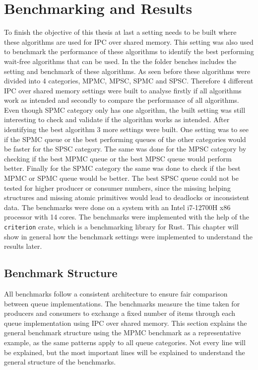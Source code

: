 \chapter{Benchmarking and Results}\label{ch:results}
To finish the objective of this thesis at last a setting needs to be built where these algorithms are used for \ac{IPC} over shared memory. This setting was also used to benchmark the performance of these algorithms to identify the best performing wait-free algorithms that can be used. In the \cite{githubMA} the folder benches includes the setting and benchmark of these algorithms. As seen before these algorithms were divided into 4 categories, \ac{MPMC}, \ac{MPSC}, \ac{SPMC} and \ac{SPSC}. Therefore 4 different \ac{IPC} over shared memory settings were built to analyse firstly if all algorithms work as intended and secondly to compare the performance of all algorithms. Even though \ac{SPMC} category only has one algorithm, the built setting was still interesting to check and validate if the algorithm works as intended. After identifying the best algorithm 3 more settings were built. One setting was to see if the \ac{SPMC} queue or the best performing queues of the other categories would be faster for the \ac{SPSC} category. The same was done for the \ac{MPSC} category by checking if the best \ac{MPMC} queue or the best \ac{MPSC} queue would perform better. Finally for the \ac{SPMC} category the same was done to check if the best \ac{MPMC} or \ac{SPMC} queue would be better. The best \ac{SPSC} queue could not be tested for higher producer or consumer numbers, since the missing helping structures and missing atomic primitives would lead to deadlocks or inconsistent data. The benchmarks were done on a system with an Intel i7-12700H x86 processor with 14 cores. The benchmarks were implemented with the help of the \texttt{criterion} crate, which is a benchmarking library for Rust. This chapter will show in general how the benchmark settings were implemented to understand the results later.

\section{Benchmark Structure}
All benchmarks follow a consistent architecture to ensure fair comparison between queue implementations. The benchmarks measure the time taken for producers and consumers to exchange a fixed number of items through each queue implementation using \ac{IPC} over shared memory. This section explains the general benchmark structure using the \ac{MPMC} benchmark as a representative example, as the same patterns apply to all queue categories. Not every line will be explained, but the most important lines will be explained to understand the general structure of the benchmarks. 

